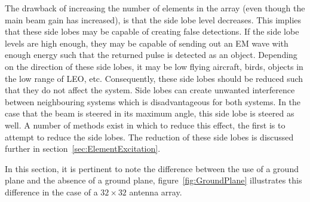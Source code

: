 \documentclass[11pt]{witseiepaper}
\begin{document}
The drawback of increasing the number of elements in the array (even though the main beam gain has increased), is that the side lobe level decreases. This implies that these side lobes may be capable of creating false detections. If the side lobe levels are high enough, they may be capable of sending out an EM wave with enough energy such that the returned pulse is detected as an object. Depending on the direction of these side lobes, it may be low flying aircraft, birds, objects in the low range of LEO, etc. Consequently, these side lobes should be reduced such that they do not affect the system.
Side lobes can create unwanted interference between neighbouring systems which is disadvantageous for both systems. In the case that the beam is steered in its maximum angle, this side lobe is steered as well. 
A number of methods exist in which to reduce this effect, the first is to attempt to reduce the side lobes.
The reduction of these side lobes is discussed further in section~\ref{sec:ElementExcitation}.

In this section, it is pertinent to note the difference between the use of a ground plane and the absence of a ground plane, figure~\ref{fig:GroundPlane} illustrates this difference in the case of a $32 \times 32$ antenna array.
\end{document}
